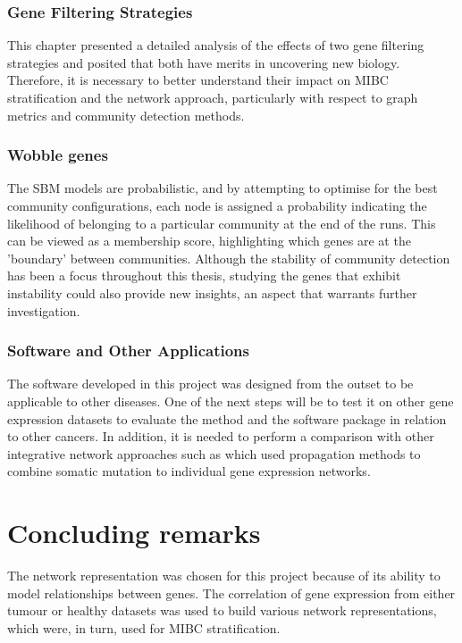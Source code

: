 \subsubsection*{Gene Filtering Strategies}

This chapter presented a detailed analysis of the effects of two gene filtering strategies and posited that both have merits in uncovering new biology. Therefore, it is necessary to better understand their impact on MIBC stratification and the network approach, particularly with respect to graph metrics and community detection methods. 

\subsubsection*{Wobble genes}

The SBM models are probabilistic, and by attempting to optimise for the best community configurations, each node is assigned a probability indicating the likelihood of belonging to a particular community at the end of the runs. This can be viewed as a membership score, highlighting which genes are at the 'boundary' between communities. Although the stability of community detection has been a focus throughout this thesis, studying the genes that exhibit instability could also provide new insights, an aspect that warrants further investigation.

\subsubsection*{Software and Other Applications}

The software developed in this project was designed from the outset to be applicable to other diseases. One of the next steps will be to test it on other gene expression datasets to evaluate the method and the software package in relation to other cancers. In addition, it is needed to perform a comparison with other integrative network approaches such as \citet{Hofree2013-ld,He2017-dj} which used propagation methods to combine somatic mutation to individual gene expression networks.


\section{Concluding remarks}

The network representation was chosen for this project because of its ability to model relationships between genes. The correlation of gene expression from either tumour or healthy datasets was used to build various network representations, which were, in turn, used for MIBC stratification.



